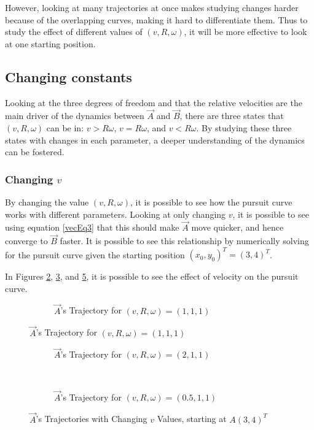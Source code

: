 \documentclass[pstricks, border=12pt]{article}
\begin{document}
However, looking at many trajectories at once makes studying changes harder because of the overlapping curves, making it hard to differentiate them. Thus to study the effect of different values of $(v, R, \omega)$, it will be more effective to look at one starting position.
\subsection{Changing constants}
Looking at the three degrees of freedom and that the relative velocities are the main driver of the dynamics between $\vec A$ and $\vec B$, there are three states that $(v, R, \omega)$ can be in:
$v > R\omega$, $v = R\omega$, and $v < R\omega$. By studying these three states with changes in each parameter, a deeper understanding of the dynamics can be fostered.

\subsubsection{Changing $v$}\label{vchange}
By changing the value $(v, R, \omega)$, it is possible to see how the pursuit curve works with different parameters. Looking at only changing $v$, it is possible to see using equation \eqref{vecEq3} that this should make $\Vec{A}$ move quicker, and hence converge to $\vec B$ faster. It is possible to see this relationship by numerically solving for the pursuit curve given the starting position $(x_0, y_0)^T = (3, 4)^T$.

In Figures \ref{fig:my_label}, \ref{fig:lab}, and \ref{fig:labb}, it is possible to see the effect of velocity on the pursuit curve.

\begin{figure}[tbh]
    \centering
    \begin{subfigure}[t]{0.5\linewidth}
         \centering
         
         \caption{$\vec A$'s Trajectory for $(v, R, \omega) = (1, 1, 1)$}
         \label{fig:my_label}
    \end{subfigure}
\end{figure}
\begin{figure}[tbh]\ContinuedFloat
    \centering
    \begin{subfigure}[t]{0.5\linewidth}
         \centering
         
         \caption{$\vec A$'s Trajectory for $(v, R, \omega) = (2, 1, 1)$}
         \label{fig:lab}
    \end{subfigure}%
    ~ 
    \begin{subfigure}[t]{0.5\linewidth}
         \centering
         
         \caption{$\vec A$'s Trajectory for $(v, R, \omega) = (0.5, 1, 1)$}
         \label{fig:labb}
    \end{subfigure}
    \caption{$\vec A$'s Trajectories with Changing $v$ Values, starting at $A(3, 4)^T$}
\end{figure}
\end{document}
